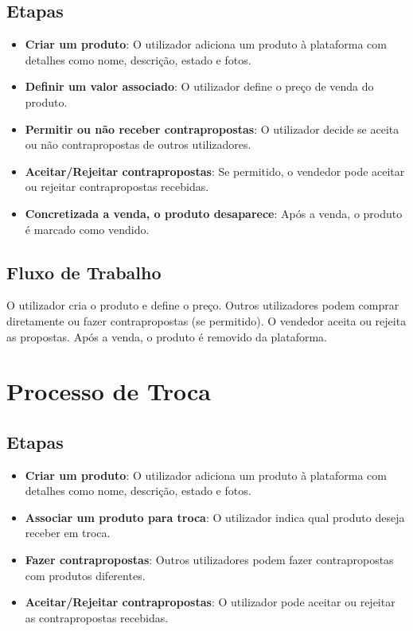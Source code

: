 \documentclass[a4paper, 12pt]{article} %
\begin{document}
\subsection{Etapas}
\begin{itemize}
    \item \textbf{Criar um produto}: O utilizador adiciona um produto à plataforma com detalhes como nome, descrição, estado e fotos.
    \item \textbf{Definir um valor associado}: O utilizador define o preço de venda do produto.
    \item \textbf{Permitir ou não receber contrapropostas}: O utilizador decide se aceita ou não contrapropostas de outros utilizadores.
    \item \textbf{Aceitar/Rejeitar contrapropostas}: Se permitido, o vendedor pode aceitar ou rejeitar contrapropostas recebidas.
    \item \textbf{Concretizada a venda, o produto desaparece}: Após a venda, o produto é marcado como vendido.
\end{itemize}

\subsection{Fluxo de Trabalho}
O utilizador cria o produto e define o preço. Outros utilizadores podem comprar diretamente ou fazer contrapropostas (se permitido). O vendedor aceita ou rejeita as propostas. Após a venda, o produto é removido da plataforma.

\section{Processo de Troca}

\subsection{Etapas}
\begin{itemize}
    \item \textbf{Criar um produto}: O utilizador adiciona um produto à plataforma com detalhes como nome, descrição, estado e fotos.
    \item \textbf{Associar um produto para troca}: O utilizador indica qual produto deseja receber em troca.
    \item \textbf{Fazer contrapropostas}: Outros utilizadores podem fazer contrapropostas com produtos diferentes.
    \item \textbf{Aceitar/Rejeitar contrapropostas}: O utilizador pode aceitar ou rejeitar as contrapropostas recebidas.
\end{itemize}
\end{document}

